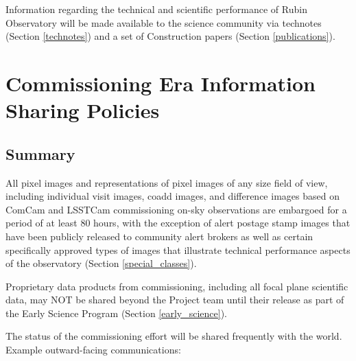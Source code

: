 \documentclass[SE,authoryear,toc]{lsstdoc}
\begin{document}
Information regarding the technical and scientific performance of Rubin Observatory will be made available to the science community via technotes (Section \ref{technotes}) and a set of Construction papers (Section \ref{publications}).

\section{Commissioning Era Information Sharing Policies}
\label{policy}

\subsection{Summary}

All pixel images and representations of pixel images of any size field of view, including individual visit images, coadd images, and difference images based on ComCam and LSSTCam commissioning on-sky observations are embargoed for a period of at least 80 hours, with the exception of alert postage stamp images that have been publicly released to community alert brokers as well as certain specifically approved types of images that illustrate technical performance aspects of the observatory (Section \ref{special_classes}).

Proprietary data products from commissioning, including all focal plane scientific data, may NOT be shared beyond the Project team until their release as part of the Early Science Program (Section \ref{early_science}).

The status of the commissioning effort will be shared frequently with the world.
Example outward-facing communications:
\end{document}
